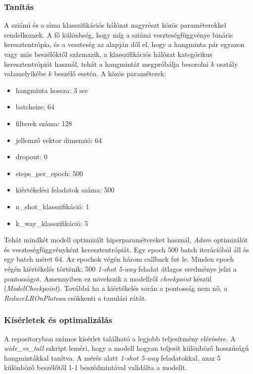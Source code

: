 \subsubsection{Tanítás}

A sziámi és a sima klasszifikációs hálózat nagyrészt közös paraméterekkel rendelkeznek. A fő különbség, hogy míg a sziámi veszteségfüggvénye bináris keresztentrópia, és a veszteség az alapján dől el, hogy a hangminta pár egyazon vagy más beszélőktől származik, a klasszifikációs hálózat kategórikus keresztentrópiát használ, tehát a hangmintát megpróbálja besorolni $k$ osztály valamelyikébe $k$ beszélő esetén. A közös paraméterek:

\begin{itemize}
	\item hangminta hossza: 3 sec
    \item batchsize: 64
    \item filterek száma: 128
    \item jellemző vektor dimenzió: 64
    \item dropout: 0
    \item steps\_per\_epoch: 500
    \item kiértékelési feladatok száma: 500
    \item n\_shot\_klasszifikáció: 1
    \item k\_way\_klasszifikáció: 5
\end{itemize}

Tehát mindkét modell optimizált hiperparamétereket használ, \emph{Adam} optimizálót és veszteségfüggvényként keresztentrópiát. Egy epoch $500$ batch iterációból áll és egy batch méret $64$.
Az epochok végén három callback fut le.
Minden epoch végén kiértékelés történik: 500 \emph{1-shot 5-way} feladat átlagos eredménye jelzi a pontosságot. Amennyiben ez növekszik a modellről \emph{checkpoint} készül (\emph{ModelCheckpoint}).
Továbbá ha a kiértékelés során a pontosság nem nő, a \emph{ReduceLROnPlateau} csökkenti a tanulási rátát.


\subsubsection{Kísérletek és optimalizálás}

A repositoryban számos kísérlet található a legjobb teljesítmény elérésére. A \emph{wide\_vs\_tall} szkript leméri, hogy a modell hogyan teljesít különböző hosszúságú hangmintákkal tanítva. A mérés alatt \emph{1-shot 5-way} feladatokkal, azaz 5 különböző beszélőtől 1-1 beszédmintával validálta a modellt.

